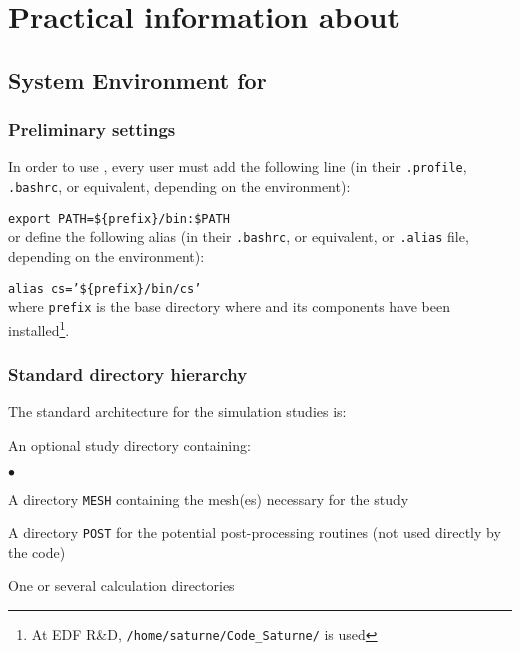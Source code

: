 \section{Practical information about \CS}

\subsection{System Environment for \CS}

\subsubsection{Preliminary settings}
\label{prg_environementCS}

In order to use \CS, every user must add the following line (in their
\texttt{.profile}, \texttt{.bashrc}, or equivalent,
depending on the environment):

\hspace*{1cm}\texttt{export PATH=\$\{prefix\}/bin:\$PATH}\\

or define the following alias (in their \texttt{.bashrc}, or
 equivalent, or \texttt{.alias} file, depending on the environment):

\hspace*{1cm}\texttt{alias cs='\$\{prefix\}/bin/cs'}\\

where \texttt{prefix} is the base directory where
\CS and its components have been installed\footnote{At EDF R\&D, \texttt{/home/saturne/Code\_Saturne/\verscs} is used}.

\subsubsection{Standard directory hierarchy}
\label{prg_architecture}%
The standard architecture for the simulation studies is:

\noindent
An optional study directory containing:
\begin{list}{$\bullet$}{}
\item A directory \texttt{MESH} containing the mesh(es)
      necessary for the study
\item A directory \texttt{POST} for the potential post-processing routines (not
used directly by the code)
\item One or several calculation directories
\end{list}


